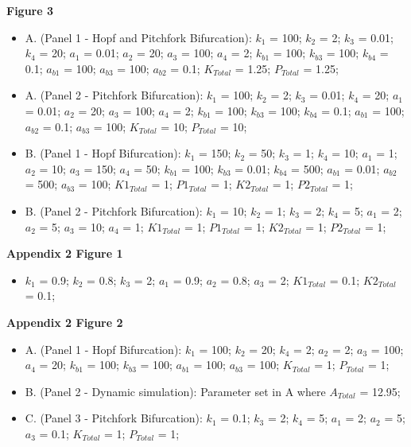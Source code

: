 \documentclass[9pt,lineno]{elife}
\begin{document}
\begin{appendixbox}
\textbf{Figure 3}
\begin{itemize}
    \item A. (Panel 1 - Hopf and Pitchfork Bifurcation): $k_1$ = 100;  $k_2$ = 2;  $k_3$ = 0.01;  $k_4$ = 20; $a_1$ = 0.01; $a_2$ = 20; $a_3$ = 100; $a_4$ = 2; $k_{b1}$ = 100; $k_{b3}$ = 100; $k_{b4}$ = 0.1; $a_{b1}$ = 100; $a_{b3}$ = 100; $a_{b2}$ = 0.1; $K_{Total}$ = 1.25;  $P_{Total}$ = 1.25;  
    
    \item A. (Panel 2 - Pitchfork Bifurcation): $k_1$ = 100; $k_2$ = 2; $k_3$ = 0.01; $k_4$ = 20; $a_1$ = 0.01; $a_2$ = 20; $a_3$ = 100; $a_4$ = 2; $k_{b1}$ = 100; $k_{b3}$ = 100; $k_{b4}$ = 0.1; $a_{b1}$ = 100; $a_{b2}$ = 0.1; $a_{b3}$ = 100; $K_{Total}$ = 10;  $P_{Total}$ = 10;  
    
    \item B. (Panel 1 - Hopf Bifurcation): $k_1$ = 150; $k_2$ = 50; $k_3$ = 1; $k_4$ = 10; $a_1$ = 1; $a_2$ = 10; $a_3$ = 150; $a_4$ = 50; $k_{b1}$ = 100; $k_{b3}$ = 0.01; $k_{b4}$ = 500; $a_{b1}$ = 0.01; $a_{b2}$ = 500; $a_{b3}$ = 100; $K1_{Total}$ = 1;  $P1_{Total}$ = 1; $K2_{Total}$ = 1;  $P2_{Total}$ = 1;
    
    \item B. (Panel 2 - Pitchfork Bifurcation): $k_1$ = 10; $k_2$ = 1; $k_3$ = 2; $k_4$ = 5; $a_1$ = 2; $a_2$ = 5; $a_3$ = 10; $a_4$ = 1; $K1_{Total}$ = 1;  $P1_{Total}$ = 1; $K2_{Total}$ = 1;  $P2_{Total}$ = 1;
\end{itemize}

\textbf{Appendix 2 Figure 1}
\begin{itemize}
    \item $k_1$ = 0.9;  $k_2$ = 0.8;  $k_3$ = 2; $a_1$ = 0.9; $a_2$ = 0.8; $a_3$ = 2; $K1_{Total}$ = 0.1; $K2_{Total}$ = 0.1;
\end{itemize}

\textbf{Appendix 2 Figure 2}
\begin{itemize}
    \item A. (Panel 1 - Hopf Bifurcation): $k_1$ = 100;  $k_2$ = 20; $k_4$ = 2; $a_2$ = 2; $a_3$ = 100; $a_4$ = 20; $k_{b1}$ = 100; $k_{b3}$ = 100; $a_{b1}$ = 100; $a_{b3}$ = 100; $K_{Total}$ = 1;  $P_{Total}$ = 1; 
    \item B. (Panel 2 - Dynamic simulation): Parameter set in  A where $A_{Total}$ = 12.95; 
    \item C. (Panel 3 - Pitchfork Bifurcation):  $k_1$ = 0.1; $k_3$ = 2; $k_4$ = 5; $a_1$ = 2; $a_2$ = 5; $a_3$ = 0.1; $K_{Total}$ = 1;  $P_{Total}$ = 1; 
\end{itemize}


\end{appendixbox}
\end{document}
